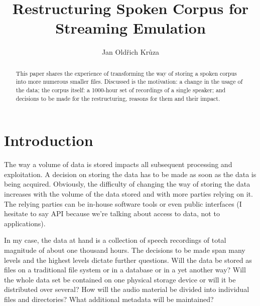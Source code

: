 \documentclass{llncs}
\begin{document}
\newtheorem{Definition}{Definition}
\title{Restructuring Spoken Corpus for Streaming Emulation}

\author{Jan Old\v{r}ich Kr\r{u}za}



\maketitle

\begin{abstract}
This paper shares the experience of transforming the way of storing a spoken
corpus into more numerous smaller files. Discussed is the motivation: a change
in the usage of the data; the corpus itself: a 1000-hour set of recordings of a
single speaker; and decisions to be made for the restructuring, reasons for them
and their impact.
\end{abstract}

\section{Introduction}

The way a volume of data is stored impacts all subsequent processing and
exploitation\cite{reppen2010building}. A decision on storing the data has to be made as soon as the
data is being acquired. Obviously, the difficulty of changing the way of storing
the data increases with the volume of the data stored and with more parties relying
on it. The relying parties can be in-house software tools or even public
interfaces (I hesitate to say API because we're talking about access to data,
not to applications).

In my case, the data at hand is a collection of speech recordings of total
magnitude of about one thousand hours. The decisions to be made span many levels
and the highest levels dictate further questions. Will the data be stored as
files on a traditional file system or in a database or in a yet another way?
Will the whole data set be contained on one physical storage device or will it
be distributed over several? How will the audio material be divided into
individual files and directories? What additional metadata will be
maintained?\cite{crowdy1993spoken}
\end{document}
